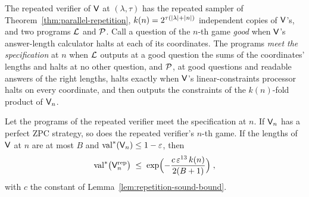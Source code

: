 \begin{definition}
\label{def:tailored-rep-spec}
\leanok
The repeated verifier of $\verifier$ at $(\lambda, \tau)$ has the repeated sampler of
Theorem~\ref{thm:parallel-repetition}, $k(n) = 2^{\tau(\abs{\lambda} + \abs{n})}$ independent
copies of $\verifier$'s, and two programs $\cal{L}$ and $\cal{P}$. Call a question of the
$n$-th game \emph{good} when $\verifier$'s answer-length calculator halts at each of its
coordinates. The programs \emph{meet the specification} at $n$ when $\cal{L}$ outputs at a
good question the sums of the coordinates' lengths and halts at no other question, and
$\cal{P}$, at good questions and readable answers of the right lengths, halts exactly when
$\verifier$'s linear-constraints processor halts on every coordinate, and then outputs the
constraints of the $k(n)$-fold product of $\verifier_n$.
\end{definition}

\begin{theorem}
\label{thm:tailored-rep-from-spec}
\leanok
Let the programs of the repeated verifier meet the specification at $n$. If $\verifier_n$ has
a perfect ZPC strategy, so does the repeated verifier's $n$-th game. If the lengths of
$\verifier$ at $n$ are at most $B$ and $\valstar(\verifier_n) \leq 1 - \eps$, then
\begin{equation*}
  \valstar\bigl(\verifier^{\mathrm{rep}}_n\bigr) \;\leq\; \exp\Bigl( - \frac{c\, \eps^{13}\,
  k(n)}{2(B + 1)} \Bigr)\;,
\end{equation*}
with $c$ the constant of Lemma~\ref{lem:repetition-sound-bound}.
\end{theorem}

